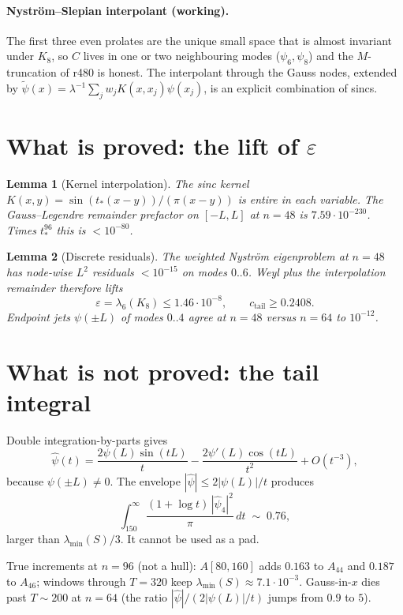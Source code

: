 \documentclass[11pt]{article}
\newtheorem{lemma}{Lemma}
\theoremstyle{remark}
\begin{document}
\paragraph{Nystr\"om--Slepian interpolant (working).}
The first three even prolates are the unique small space
that is almost invariant under $K_8$, so $C$ lives in one
or two neighbouring modes ($\psi_6,\psi_8$) and the
$M$-truncation of r480 is honest.
The interpolant through the Gauss nodes, extended by
$\widetilde\psi(x)=\lambda^{-1}\sum_j w_j K(x,x_j)\psi(x_j)$,
is an explicit combination of sincs.

\section{What is proved: the lift of $\varepsilon$}

\begin{lemma}[Kernel interpolation]
The sinc kernel $K(x,y)=\sin(t_*(x-y))/(\pi(x-y))$
is entire in each variable.
The Gauss--Legendre remainder prefactor on $[-L,L]$ at $n=48$
is $7.59\cdot10^{-230}$.
Times $t_*^{96}$ this is $<10^{-80}$.
\end{lemma}

\begin{lemma}[Discrete residuals]
The weighted Nystr\"om eigenproblem at $n=48$ has
node-wise $L^2$ residuals $<10^{-15}$ on modes $0..6$.
Weyl plus the interpolation remainder therefore lifts
\[
 \varepsilon=\lambda_6(K_8)\le1.46\cdot10^{-8},
 \qquad
 c_{\mathrm{tail}}\ge0.2408.
\]
Endpoint jets $\psi(\pm L)$ of modes $0..4$ agree at
$n=48$ versus $n=64$ to $10^{-12}$.
\end{lemma}

\section{What is not proved: the tail integral}

Double integration-by-parts gives
\[
 \hat\psi(t)
 =\frac{2\psi(L)\sin(tL)}{t}
 -\frac{2\psi'(L)\cos(tL)}{t^2}
 +O(t^{-3}),
\]
because $\psi(\pm L)\ne0$.
The envelope $|\hat\psi|\le2|\psi(L)|/t$ produces
\[
 \int_{150}^\infty\frac{(1+\log t)\,|\widehat{\psi}_4|^2}{\pi}\,dt
 \;\sim\;0.76,
\]
larger than $\lambda_{\min}(S)/3$.
It cannot be used as a pad.

True increments at $n=96$ (not a hull):
$A[80,160]$ adds $0.163$ to $A_{44}$ and $0.187$ to $A_{46}$;
windows through $T=320$ keep
$\lambda_{\min}(S)\approx7.1\cdot10^{-3}$.
Gauss-in-$x$ dies past $T\sim200$ at $n=64$
(the ratio $|\hat\psi|/(2|\psi(L)|/t)$ jumps from $0.9$ to $5$).
\end{document}

